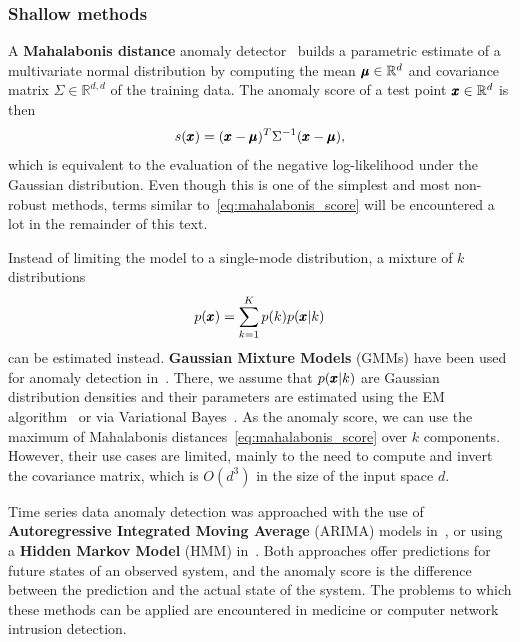 \subsubsection{Shallow methods}
A \textbf{Mahalabonis distance} anomaly detector~\cite{laurikkala2000informal} builds a parametric estimate of a multivariate normal distribution by computing the mean $\pmb{{\mu}} \in \mathbb{R}^d$ and covariance matrix $\Sigma \in \mathbb{R}^{d,d}$ of the training data. The anomaly score of a test point $\pmb{{x}} \in \mathbb{R}^d$ is then
\begin{equation} \label{eq:mahalabonis_score}
	s(\pmb{{x}}) =  (\pmb{{x}} - \pmb{{\mu}}) ^T \Sigma ^{-1} (\pmb{{x}}-\pmb{{\mu}}),
\end{equation}
which is equivalent to the evaluation of the negative log-likelihood under the Gaussian distribution. Even though this is one of the simplest and most non-robust methods, terms similar to~\eqref{eq:mahalabonis_score} will be encountered a lot in the remainder of this text.

Instead of limiting the model to a single-mode distribution, a mixture of $k$ distributions 
\begin{equation} \label{eq:mixture}
	p(\pmb{{x}}) = \sum_{k=1}^K p(k) p(\pmb{{x}}|k)
\end{equation}
can be estimated instead. \textbf{Gaussian Mixture Models} (GMMs) have been used for anomaly detection in~\cite{roberts1994probabilistic,mahadevan2010anomaly}. There, we assume that $p(\pmb{{x}}|k)$ are Gaussian distribution densities and their parameters are estimated using the EM algorithm~\cite{dempster1977maximum} or via Variational Bayes~\cite{bishop2006pattern}. As the anomaly score, we can use the maximum of Mahalabonis distances~\eqref{eq:mahalabonis_score} over $k$ components. However, their use cases are limited, mainly to the need to compute and invert the covariance matrix, which is $O(d^3)$ in the size of the input space $d$.

Time series data anomaly detection was approached with the use of \textbf{Autoregressive Integrated Moving Average} (ARIMA) models in~\cite{roberts1994probabilistic,hoare2002line}, or using a \textbf{Hidden Markov Model} (HMM) in~\cite{yeung2003host,zhang2003new}. Both approaches offer predictions for future states of an observed system, and the anomaly score is the difference between the prediction and the actual state of the system. The problems to which these methods can be applied are encountered in medicine or computer network intrusion detection.

